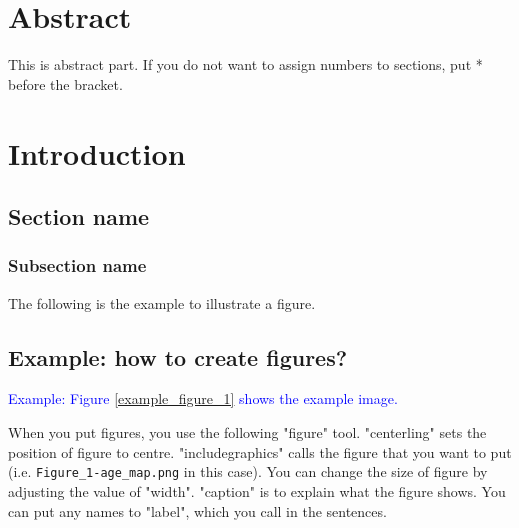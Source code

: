 \documentclass[12pt]{article}
\begin{document}
% 
% 
\section*{Abstract}
This is abstract part. If you do not want to assign numbers to sections, put * before the bracket.



% 
% 
\newpage
\tableofcontents
\listoffigures
\listoftables

\clearpage



% 
% 
\section{Introduction}
\subsection{Section name}
\subsubsection{Subsection name}
The following is the example to illustrate a figure. 

\subsection{Example: how to create figures?}
\textcolor{blue}{Example: Figure \ref{example_figure_1} shows the example image.}

When you put figures, you use the following "figure" tool. "centerling" sets the position of figure to centre. "includegraphics" calls the figure that you want to put (i.e. \verb|Figure_1-age_map.png| in this case). You can change the size of figure by adjusting the value of "width". "caption" is to explain what the figure shows. You can put any names to "label", which you call in the sentences.
\end{document}
